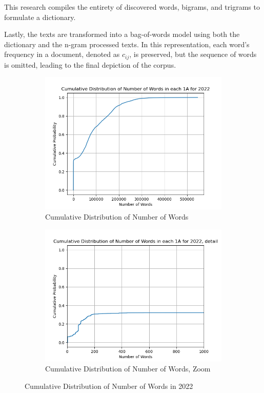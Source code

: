 \documentclass[12pt, letterpaper]{article}
\begin{document}
This research compiles the entirety of discovered words, bigrams, and trigrams to formulate a dictionary. 

Lastly, the texts are transformed into a bag-of-words model using both the dictionary and the n-gram processed texts. In this representation, each word's frequency in a document, denoted as \(c_{ij}\), is preserved, but the sequence of words is omitted, leading to the final depiction of the corpus.

\begin{figure}[H] %
  \centering
  \begin{subfigure}{0.45\textwidth}
    \centering
    \includegraphics[width=\textwidth]{cdf_words}
	\caption{Cumulative Distribution of Number of Words}	
    \label{fig:figure1}
  \end{subfigure}
  \hfill
  \begin{subfigure}{0.45\textwidth}
    \centering
    \includegraphics[width=\textwidth]{cdf_words_zoom}
	\caption{Cumulative Distribution of Number of Words, Zoom}
    \label{fig:figure2}
  \end{subfigure}
  \caption{Cumulative Distribution of Number of Words in 2022}
  \label{fig:cdf}
\end{figure}
\end{document}
